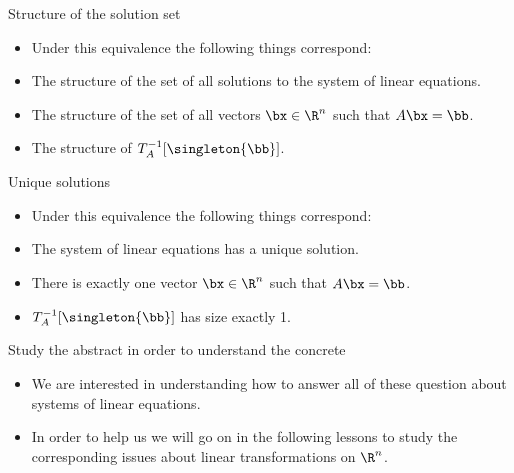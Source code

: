 \documentclass{beamer}
\begin{document}

\begin{frame}{Structure of the solution set}

\begin{itemize}
\item Under this equivalence the following things correspond:
\item The structure of the set of all solutions to the system of linear equations.
\item The structure of the set of all vectors $\bx \in \R^n$ such that $A \bx = \bb$.
\item The structure of $T_A^{-1}[\singleton{\bb}]$.
\end{itemize}

\end{frame}


\begin{frame}{Unique solutions}

\begin{itemize}
\item Under this equivalence the following things correspond:
\item The system of linear equations has a unique solution.
\item There is exactly one vector $\bx \in \R^n$ such that $A \bx = \bb$.
\item $T_A^{-1}[\singleton{\bb}]$ has size exactly 1.
\end{itemize}

\end{frame}


\begin{frame}{Study the abstract in order to understand the concrete}

\begin{itemize}
\item We are interested in understanding how to answer all of these question
about systems of linear equations.
\item In order to help us we will go on in the following lessons to
study the corresponding issues about linear transformations on $\R^n$.
\end{itemize}

\end{frame}
\end{document}
